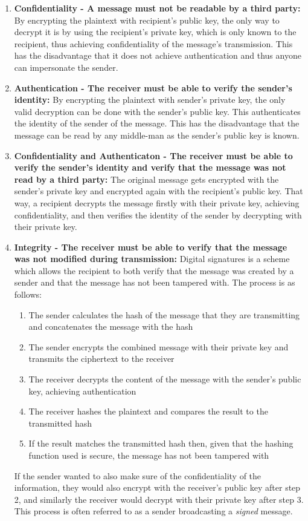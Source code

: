 \begin{enumerate}
    \item \textbf{Confidentiality - A message must not be readable by a third party:} By encrypting the plaintext with recipient's public key, the only way to decrypt it is by using the recipient's private key, which is only known to the recipient, thus achieving confidentiality of the message's transmission. This has the disadvantage that it does not achieve authentication and thus anyone can impersonate the sender.
    \item \textbf{Authentication - The receiver must be able to verify the sender's identity:} By encrypting the plaintext with sender's private key, the only valid decryption can be done with the sender's public key. This authenticates the identity of the sender of the message. This has the disadvantage that the message can be read by any middle-man as the sender's public key is known.
    \item \textbf{Confidentiality and Authenticaton - The receiver must be able to verify the sender's identity and verify that the message was not read by a third party:} The original message gets encrypted with the sender's private key and encrypted again with the recipient's public key. That way, a recipient decrypts the message firstly with their private key, achieving confidentiality, and then verifies the identity of the sender by decrypting with their private key.
    \item \textbf{Integrity - The receiver must be able to verify that the message was not modified during transmission:} Digital signatures is a scheme which allows the recipient to both verify that the message was created by a sender and that the message has not been tampered with. 
    The process is as follows:
    \begin{enumerate}
        \item The sender calculates the hash of the message that they are transmitting and concatenates the message with the hash
        \item The sender encrypts the combined message with their private key and transmits the ciphertext to the receiver  
        \item The receiver decrypts the content of the message with the sender's public key, achieving authentication
        \item The receiver hashes the plaintext and compares the result to the transmitted hash
        \item If the result matches the transmitted hash  then, given that the hashing function used is secure,
        the message has not been tampered with
    \end{enumerate}
    If the sender wanted to also make sure of the confidentiality of the information, they would also encrypt with the receiver's public key after step 2, and similarly the receiver would decrypt with their private key after step 3. This process is often referred to as a sender broadcasting a \textit{signed} message.

\end{enumerate}

